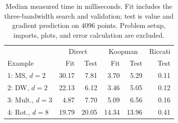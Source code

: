 \begin{table}[htbp]
\centering\small
\caption{Median measured time in milliseconds. Fit includes the three-bandwidth search and validation; test is value and gradient prediction on 4096 points. Problem setup, imports, plots, and error calculation are excluded.}\label{tab:timing}
\begin{tabular}{@{}lrrrrr@{}}
\toprule
 & \multicolumn{2}{c}{Direct} & \multicolumn{2}{c}{Koopman} & Riccati\\
Example & Fit & Test & Fit & Test & Test\\
\midrule
1: MS, $d=2$ & 30.17 & 7.81 & 3.70 & 5.29 & 0.11\\
2: DW, $d=2$ & 22.13 & 6.12 & 3.46 & 5.05 & 0.12\\
3: Mult., $d=3$ & 4.87 & 7.70 & 5.09 & 6.56 & 0.16\\
4: Rot., $d=8$ & 19.79 & 20.05 & 14.34 & 13.96 & 0.41\\
\bottomrule
\end{tabular}
\end{table}
